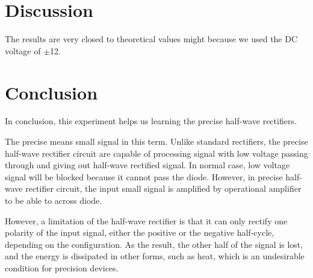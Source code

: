 \section{Discussion}
    The results are very closed to theoretical values might because we used the DC voltage of $\pm$12.

\section{Conclusion}
    In conclusion, this experiment helps us learning the precise half-wave rectifiers.\par
    The precise means small signal in this term. Unlike standard rectifiers, the precise half-wave rectifier circuit are capable of processing signal with low voltage passing through and giving out half-wave rectified signal. In normal case, low voltage signal will be blocked because it cannot pass the diode. However, in precise half-wave rectifier circuit, the input small signal is amplified by operational amplifier to be able to across diode.\par
    However, a limitation of the half-wave rectifier is that it can only rectify one polarity of the input signal, either the positive or the negative half-cycle, depending on the configuration. As the result, the other half of the signal is lost, and the energy is dissipated in other forms, such as heat, which is an undesirable condition for precision devices.